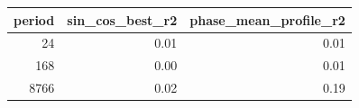 \begin{tabular}{rrr}
\toprule
period & sin\_cos\_best\_r2 & phase\_mean\_profile\_r2 \\
\midrule
24 & 0.01 & 0.01 \\
168 & 0.00 & 0.01 \\
8766 & 0.02 & 0.19 \\
\bottomrule
\end{tabular}

